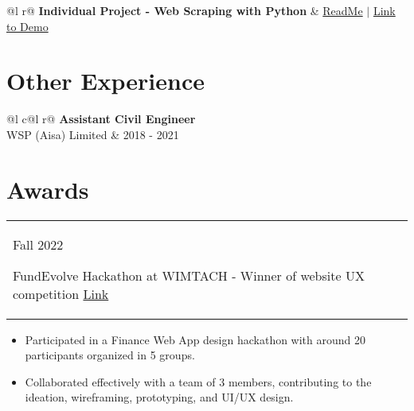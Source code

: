 \documentclass[a4paper,12pt]{article}
\begin{document}
    \begin{tabularx}{\linewidth}{ @{}l r@{} }
    \textbf{Individual Project - Web Scraping with Python}   & \hfill 
     \href{https://github.com/anth0nywong/podcast_scraping} {ReadMe} $|$ \href{https://podcast.anthonyhhwong.link/} {Link to Demo}\\[3.75pt]
    \end{tabularx}




\section{Other Experience}

    \begin{tabularx}{\linewidth}{ @{}l c@{}l r@{} }
    \textbf{Assistant Civil Engineer} \\ [3.75pt]
    WSP (Aisa) Limited &  \hfill 2018 - 2021 \\ [-10pt]
    \end{tabularx}


\section{Awards}
\begin{tabularx}{\linewidth}{@{}l X@{}}	
        Fall 2022 \
        \begin{minipage}[t]{0.875\linewidth}
        FundEvolve Hackathon at WIMTACH - Winner of website UX competition \hfill\href{https://anth0nywong.github.io/resume/activities/1.0_certificate.pdf}{Link}
                \end{minipage}\\
        \end{tabularx}
        \begin{itemize}[nosep,after=\strut, leftmargin=1em, itemsep=3pt]
        \item Participated in a Finance Web App design hackathon with around 20 participants organized in 5 groups.\item Collaborated effectively with a team of 3 members, contributing to the ideation, wireframing, prototyping, and UI/UX design.
        \end{itemize}


\vfill
\end{document}
